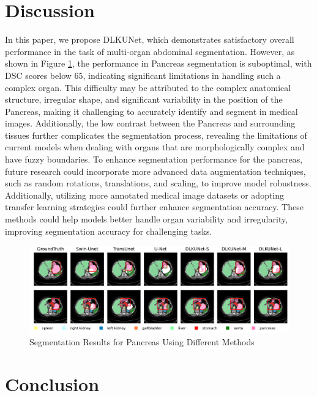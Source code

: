 \documentclass[sn-mathphys-num]{sn-jnl}
\theoremstyle{thmstyleone}%
\theoremstyle{thmstyletwo}%
\theoremstyle{thmstylethree}%
\begin{document}
\section{Discussion}\label{sec6}
In this paper, we propose DLKUNet, which demonstrates satisfactory overall performance in the task of multi-organ abdominal segmentation.
However, as shown in Figure \ref{fig10}, the performance in Pancreas segmentation is suboptimal, with DSC scores below 65, indicating significant limitations in handling such a complex organ.
This difficulty may be attributed to the complex anatomical structure, irregular shape, and significant variability in the position of the Pancreas, making it challenging to accurately identify and segment in medical images.
Additionally, the low contrast between the Pancreas and surrounding tissues further complicates the segmentation process, revealing the limitations of current models when dealing with organs that are morphologically complex and have fuzzy boundaries.
To enhance segmentation performance for the pancreas, future research could incorporate more advanced data augmentation techniques,
such as random rotations, translations, and scaling, to improve model robustness.
Additionally, utilizing more annotated medical image datasets or adopting transfer learning strategies could further enhance segmentation accuracy.
These methods could help models better handle organ variability and irregularity, improving segmentation accuracy for challenging tasks.

\begin{figure}[h]
    \centering
    \includegraphics[width=\textwidth]{figure11.pdf}
    \caption{Segmentation Results for Pancreas Using Different Methods}\label{fig10}
\end{figure}

\section{Conclusion}\label{sec7}
\end{document}

